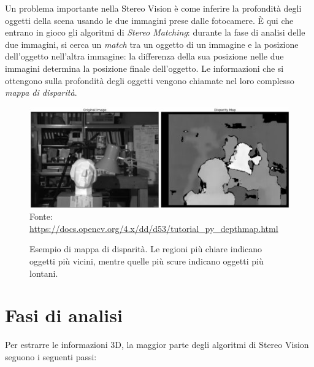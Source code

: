 \documentclass[12pt,a4paper,openright,twoside]{report}
\begin{document}
Un problema importante nella Stereo Vision è come inferire la profondità degli oggetti della scena usando le due immagini prese dalle fotocamere. È qui che entrano in gioco gli algoritmi di \textit{Stereo Matching}: durante la fase di analisi delle due immagini, si cerca un \textit{match} tra un oggetto di un immagine e la posizione dell'oggetto nell'altra immagine: la differenza della sua posizione nelle due immagini determina la posizione finale dell'oggetto. Le informazioni che si ottengono sulla profondità degli oggetti vengono chiamate nel loro complesso \textit{mappa di disparità}.

\begin{figure}[h]
    \centering
    \def\stackalignment{r}
    \stackunder
        {\includegraphics[width=\textwidth]{disparity_map.jpg}}
        {\scriptsize Fonte: \url{https://docs.opencv.org/4.x/dd/d53/tutorial_py_depthmap.html}}
    \caption[Esempio di mappa di disparità.]{Esempio di mappa di disparità. Le regioni più chiare indicano oggetti più vicini, mentre quelle più scure indicano oggetti più lontani.}
    \label{img:disparity_map}
\end{figure}

\section{Fasi di analisi}

Per estrarre le informazioni 3D, la maggior parte degli algoritmi di Stereo Vision seguono i seguenti passi:
\end{document}
